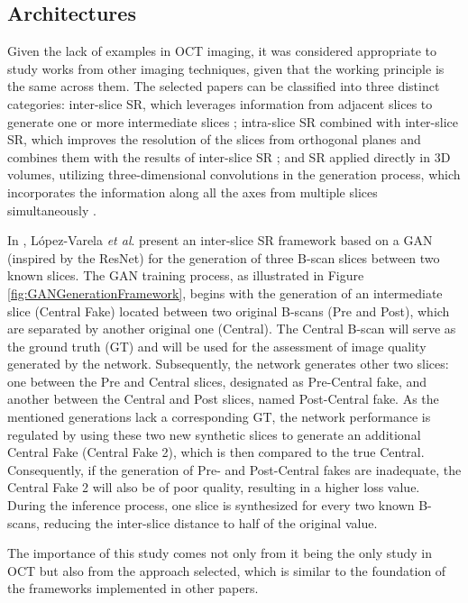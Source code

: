 \subsection{Architectures}
Given the lack of examples in OCT imaging, it was considered appropriate to study works from other imaging techniques, given that the working principle is the same across them. The selected papers can be classified into three distinct categories: inter-slice SR, which leverages information from adjacent slices to generate one or more intermediate slices \parencite{Lopez2023, Xia2021, Wu2022, Nishimoto2024}; intra-slice SR combined with inter-slice SR, which improves the resolution of the slices from orthogonal planes and combines them with the results of inter-slice SR \parencite{Zhang2024, Fang2022, Nimitha2024, Georgescu2020}; and SR applied directly in 3D volumes, utilizing three-dimensional convolutions in the generation process, which incorporates the information along all the axes from multiple slices simultaneously \parencite{YChen2018, Sanchez2018, Kudo2019, Zhang2022}.
\par
In \textcite{Lopez2023}, López-Varela \textit{et al}. present an inter-slice SR framework based on a GAN (inspired by the ResNet) for the generation of three B-scan slices between two known slices. The GAN training process, as illustrated in Figure \ref{fig:GANGenerationFramework}, begins with the generation of an intermediate slice (Central Fake) located between two original B-scans (Pre and Post), which are separated by another original one (Central). The Central B-scan will serve as the ground truth (GT) and will be used for the assessment of image quality generated by the network. Subsequently, the network generates other two slices: one between the Pre and Central slices, designated as Pre-Central fake, and another between the Central and Post slices, named Post-Central fake. As the mentioned generations lack a corresponding GT, the network performance is regulated by using these two new synthetic slices to generate an additional Central Fake (Central Fake 2), which is then compared to the true Central. Consequently, if the generation of Pre- and Post-Central fakes are inadequate, the Central Fake 2 will also be of poor quality, resulting in a higher loss value. During the inference process, one slice is synthesized for every two known B-scans, reducing the inter-slice distance to half of the original value.
\par
The importance of this study comes not only from it being the only study in OCT but also from the approach selected, which is similar to the foundation of the frameworks implemented in other papers. 

